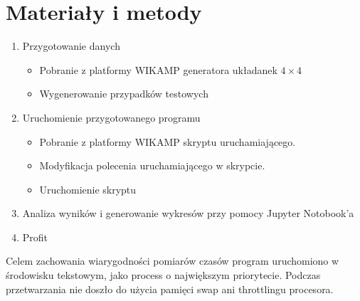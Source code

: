\documentclass{classrep}
\begin{document}
\section{Materiały i metody}

\begin{enumerate}
    \item  Przygotowanie danych
        \begin{itemize}
            \item Pobranie z platformy WIKAMP generatora układanek $4\times 4$
            \item Wygenerowanie przypadków testowych
        \end{itemize}
    \item Uruchomienie przygotowanego programu
        \begin{itemize}
            \item Pobranie z platformy WIKAMP skryptu uruchamiającego.
            \item Modyfikacja polecenia uruchamiającego w skrypcie.
            \item Uruchomienie skryptu
        \end{itemize}
    \item Analiza wyników i generowanie wykresów przy pomocy Jupyter Notobook'a
    \item Profit
\end{enumerate}

Celem zachowania wiarygodności pomiarów czasów program uruchomiono w środowisku tekstowym, jako process o największym priorytecie.
Podczas przetwarzania nie doszło do użycia pamięci swap ani throttlingu procesora.
\end{document}
